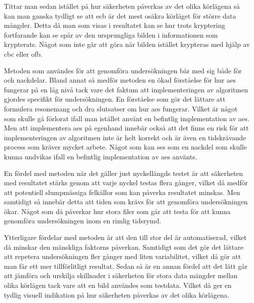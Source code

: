 Tittar man sedan istället på hur säkerheten påverkas av det olika körlägena så kan man ganska tydligt se att \acrshort{ecb} är det mest osäkra körläget för större data mängder.
Detta då man som visas i resultatet kan se hur trots kryptering fortfarande kan se spår av den ursprungliga bilden i informationen som krypterats. Något som inte
går att göra när bilden istället krypteras med hjälp av \acrshort{cbc} eller \acrshort{ofb}.

Metoden som användes för att genomföra undersökningen bär med sig både för och nackdelar. Bland annat så medför metoden en ökad förståelse för hur \acrfull{aes} fungerar
på en låg nivå tack vare det faktum att implementeringen av algoritmen gjordes specifikt för undersökningen. En förståelse som gör det lättare att formulera resonemang och
dra slutsatser om hur \acrshort{aes} fungerar. Vilket är något som skulle gå förlorat ifall man istället använt en befintlig implementation av \acrshort{aes}. Men att implementera
\acrshort{aes} på egenhand innebär också att det finns en risk för att implementeringen av algoritmen inte är helt korrekt och är även en tidskrävande process som kräver
mycket arbete. Något som kan ses som en nackdel som skulle kunna undvikas ifall en befintlig implementation av \acrshort{aes} använts.

En fördel med metoden när det gäller just nyckellängds testet är att säkerheten med resultatet stärks genom att varje nyckel testas flera gånger, vilket då medför att
potentiell slumpmässiga felkällor som kan påverka resultatet minskas. Men samtidigt så innebär detta att tiden som krävs för att genomföra undersökningen ökar. Något som
då påverkar hur stora filer som går att testa för att kunna genomföra undersökningen inom en rimlig tidsrymd.

Ytterligare fördelar med metoden är att den till stor del är automatiserad, vilket då minskar den mänskliga faktorns påverkan. Samtidigt som det gör det lättare att
repetera undersökningen fler gånger med liten variabilitet, vilket då gör att man får ett mer tillförlitligt resultat. Sedan så är
en annan fördel att det lätt går att jämföra och urskilja skillnader i säkerheten för stora data mängder mellan olika körlägen tack vare att en bild användes som testdata.
Vilket då ger en tydlig visuell indikation på hur säkerheten påverkas av det olika körlägena.

